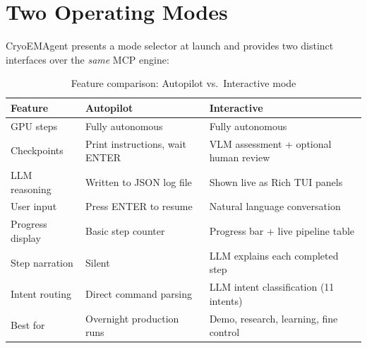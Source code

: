 \documentclass[12pt, a4paper]{article}
\begin{document}
\section{Two Operating Modes}
\label{sec:modes}

CryoEMAgent presents a mode selector at launch and provides two distinct
interfaces over the \emph{same} MCP engine:

\begin{table}[H]
\centering
\caption{Feature comparison: Autopilot vs.\ Interactive mode}
\label{tab:modes}
\renewcommand{\arraystretch}{1.3}
\begin{tabularx}{\textwidth}{l X X}
\toprule
\textbf{Feature} & \textbf{Autopilot} & \textbf{Interactive} \\
\midrule
GPU steps         & Fully autonomous & Fully autonomous \\
Checkpoints       & Print instructions, wait ENTER
                  & VLM assessment + optional human review \\
LLM reasoning     & Written to JSON log file
                  & Shown live as Rich TUI panels \\
User input        & Press ENTER to resume
                  & Natural language conversation \\
Progress display  & Basic step counter
                  & Progress bar + live pipeline table \\
Step narration    & Silent
                  & LLM explains each completed step \\
Intent routing    & Direct command parsing
                  & LLM intent classification (11 intents) \\
Best for          & Overnight production runs
                  & Demo, research, learning, fine control \\
\bottomrule
\end{tabularx}
\end{table}
\end{document}
